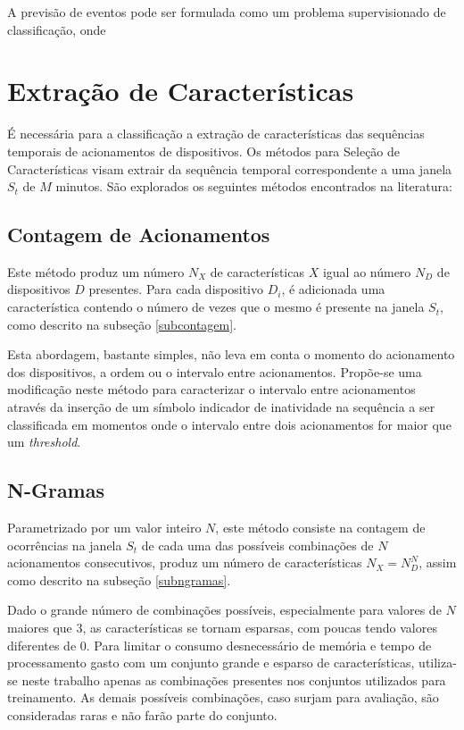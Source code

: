 \documentclass[
	12pt,				%
	openright,			%
	twoside,			%
	a4paper,			%
	english,			%
	spanish,			%
	brazil,				%
	]{abntex2}\usepackage[]{graphicx}\usepackage[]{color}
\begin{document}
A previsão de eventos pode ser formulada como um problema supervisionado de classificação, onde 

\section{Extração de Características}

É necessária para a classificação a extração de características das sequências temporais de acionamentos de dispositivos. Os métodos para Seleção de Características visam extrair da sequência temporal correspondente a uma janela $S_t$ de $M$ minutos. São explorados os seguintes métodos encontrados na literatura:

\subsection{Contagem de Acionamentos}

Este método produz um número $N_X$ de características $X$ igual ao número $N_D$ de dispositivos $D$ presentes. Para cada dispositivo $D_i$, é adicionada uma característica contendo o número de vezes que o mesmo é presente na janela $S_t$, como descrito na subseção \ref{subcontagem}.

Esta abordagem, bastante simples, não leva em conta o momento do acionamento dos dispositivos, a ordem ou o intervalo entre acionamentos. Propõe-se uma modificação neste método para caracterizar o intervalo entre acionamentos através da inserção de um símbolo indicador de inatividade na sequência a ser classificada em momentos onde o intervalo entre dois acionamentos for maior que um \textit{threshold}.

\subsection{N-Gramas}

Parametrizado por um valor inteiro $N$, este método consiste na contagem de ocorrências na janela $S_t$ de cada uma das possíveis combinações de $N$ acionamentos consecutivos, produz um número de características $N_X = N_{D}^{N}$, assim como descrito na subseção \ref{subngramas}.

Dado o grande número de combinações possíveis, especialmente para valores de $N$ maiores que $3$, as características se tornam esparsas, com poucas tendo valores diferentes de $0$. Para limitar o consumo desnecessário de memória e tempo de processamento gasto com um conjunto grande e esparso de características, utiliza-se neste trabalho apenas as combinações presentes nos conjuntos utilizados para treinamento. As demais possíveis combinações, caso surjam para avaliação, são consideradas raras e não farão parte do conjunto.
\end{document}
